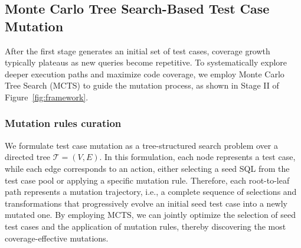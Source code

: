 








\subsection{Monte Carlo Tree Search-Based Test Case Mutation}


After the first stage generates an initial set of test cases, coverage growth typically plateaus as new queries become repetitive. To systematically explore deeper execution paths and maximize code coverage, we employ Monte Carlo Tree Search (MCTS) to guide the mutation process, as shown in Stage II of Figure~\ref{fig:framework}.

\subsubsection{Mutation rules curation}

We formulate test case mutation as a tree-structured search problem over a directed tree $\mathcal{T} = (V, E)$. In this formulation, each node represents a test case, while each edge corresponds to an action, either selecting a seed SQL from the test case pool or applying a specific mutation rule. Therefore, each root-to-leaf path represents a mutation trajectory, i.e., a complete sequence of selections and transformations that progressively evolve an initial seed test case into a newly mutated one. By employing MCTS, we can jointly optimize the selection of seed test cases and the application of mutation rules, thereby discovering the most coverage-effective mutations.

